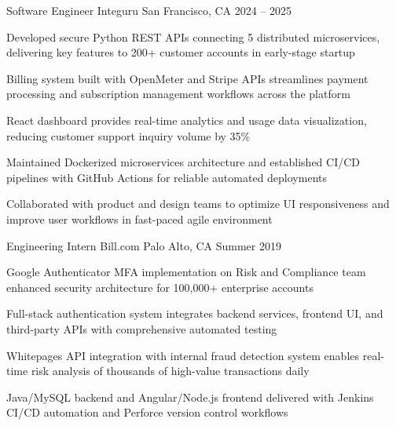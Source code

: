 \documentclass[12pt, letterpaper]{russell}
\begin{document}
\vspace{-0.2cm}
\begin{cventries}

\cventry
  {Software Engineer} %
  {Integuru} %
  {San Francisco, CA} %
  {2024 -- 2025} %
  {
\begin{cvitems}
  \item {Developed secure Python REST APIs connecting 5 distributed microservices, delivering key features to 200+ customer accounts in early-stage startup}
  \item {Billing system built with OpenMeter and Stripe APIs streamlines payment processing and subscription management workflows across the platform}
  \item {React dashboard provides real-time analytics and usage data visualization, reducing customer support inquiry volume by 35\%}
  \item {Maintained Dockerized microservices architecture and established CI/CD pipelines with GitHub Actions for reliable automated deployments}
  \item {Collaborated with product and design teams to optimize UI responsiveness and improve user workflows in fast-paced agile environment}
\end{cvitems}
}

\vspace{0.1cm}

  \cventry
    {Engineering Intern} %
    {Bill.com} %
    {Palo Alto, CA} %
    {Summer 2019} %
    {
\begin{cvitems}
  \item {Google Authenticator MFA implementation on Risk and Compliance team enhanced security architecture for 100,000+ enterprise accounts}
  \item {Full-stack authentication system integrates backend services, frontend UI, and third-party APIs with comprehensive automated testing}
  \item {Whitepages API integration with internal fraud detection system enables real-time risk analysis of thousands of high-value transactions daily}
  \item {Java/MySQL backend and Angular/Node.js frontend delivered with Jenkins CI/CD automation and Perforce version control workflows}
\end{cvitems}
    }

\end{cventries}
\vspace{-0.25cm}
\end{document}
